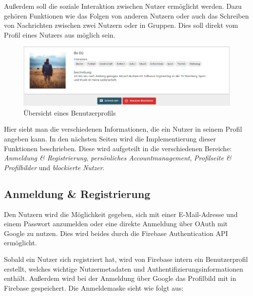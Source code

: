 Außerdem soll die soziale Interaktion zwischen Nutzer ermöglicht werden.
Dazu gehören Funktionen wie das Folgen von anderen Nutzern oder auch das Schreiben von Nachrichten zwischen zwei Nutzern oder in Gruppen.
Dies soll direkt vom Profil eines Nutzers aus möglich sein.

\begin{figure}[ht!]
    \begin{centering}
        \includegraphics[width=1\textwidth]{figures/implementation/profile-header.png}
        \caption{Übersicht eines Benutzerprofils}
        \label{fig:userProfileHeader}
    \end{centering}
\end{figure}

Hier sieht man die verschiedenen Informationen, die ein Nutzer in seinem Profil angeben kann.
In den nächsten Seiten wird die Implementierung dieser Funktionen beschrieben.
Diese wird aufgeteilt in die verschiedenen Bereiche: \textit{Anmeldung \& Registrierung}, \textit{persönliches Accountmanagement}, \textit{Profilseite \& Profilbilder} und \textit{blockierte Nutzer}.

\subsection{Anmeldung \& Registrierung}
\label{sec:login}

Den Nutzern wird die Möglichkeit gegeben, sich mit einer E-Mail-Adresse und einem Passwort anzumelden oder eine direkte Anmeldung über OAuth mit Google zu nutzen.
Dies wird beides durch die Firebase Authentication API ermöglicht.

Sobald ein Nutzer sich registriert hat, wird von Firebase intern ein Benutzerprofil erstellt, welches wichtige Nutzermetadaten und Authentifizierungsinformationen enthält.
Außerdem wird bei der Anmeldung über Google das Profilbild mit in Firebase gespeichert.
Die Anmeldemaske sieht wie folgt aus:

